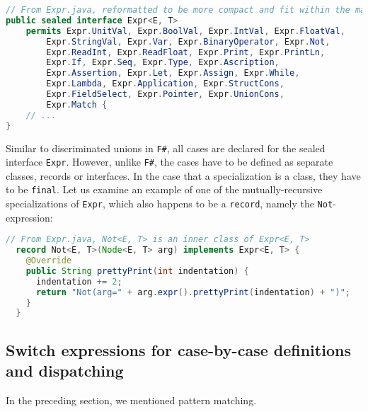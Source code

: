 \begin{lstlisting}[language=Java]
// From Expr.java, reformatted to be more compact and fit within the margins
public sealed interface Expr<E, T>
    permits Expr.UnitVal, Expr.BoolVal, Expr.IntVal, Expr.FloatVal,
        Expr.StringVal, Expr.Var, Expr.BinaryOperator, Expr.Not,
        Expr.ReadInt, Expr.ReadFloat, Expr.Print, Expr.PrintLn,
        Expr.If, Expr.Seq, Expr.Type, Expr.Ascription,
        Expr.Assertion, Expr.Let, Expr.Assign, Expr.While,
        Expr.Lambda, Expr.Application, Expr.StructCons,
        Expr.FieldSelect, Expr.Pointer, Expr.UnionCons,
        Expr.Match {
    // ...
}
\end{lstlisting}

Similar to discriminated unions in \texttt{F\#}, all cases are declared for the sealed interface \texttt{Expr}. However, unlike \texttt{F\#},
the cases have to be defined as separate classes, records or interfaces. In the case that a specialization is a class, they have to be \texttt{final}.
Let us examine an example of one of the mutually-recursive specializations of \texttt{Expr}, which also happens to be a \texttt{record}, namely the \texttt{Not}-expression:

\begin{lstlisting}[language=Java]
  // From Expr.java, Not<E, T> is an inner class of Expr<E, T>
  record Not<E, T>(Node<E, T> arg) implements Expr<E, T> {
    @Override
    public String prettyPrint(int indentation) {
      indentation += 2;
      return "Not(arg=" + arg.expr().prettyPrint(indentation) + ")";
    }
  }
\end{lstlisting}

\subsection{Switch expressions for case-by-case definitions and dispatching}

In the preceding section, we mentioned pattern matching. 

